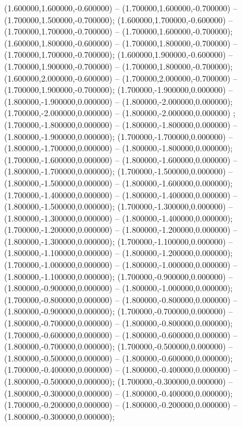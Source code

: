  (1.600000,1.600000,-0.600000) -- (1.700000,1.600000,-0.700000) -- (1.700000,1.500000,-0.700000);
 (1.600000,1.700000,-0.600000) -- (1.700000,1.700000,-0.700000) -- (1.700000,1.600000,-0.700000);
 (1.600000,1.800000,-0.600000) -- (1.700000,1.800000,-0.700000) -- (1.700000,1.700000,-0.700000);
 (1.600000,1.900000,-0.600000) -- (1.700000,1.900000,-0.700000) -- (1.700000,1.800000,-0.700000);
 (1.600000,2.000000,-0.600000) -- (1.700000,2.000000,-0.700000) -- (1.700000,1.900000,-0.700000);
 (1.700000,-1.900000,0.000000) -- (1.800000,-1.900000,0.000000) -- (1.800000,-2.000000,0.000000);
 (1.700000,-2.000000,0.000000) -- (1.800000,-2.000000,0.000000) ;
 (1.700000,-1.800000,0.000000) -- (1.800000,-1.800000,0.000000) -- (1.800000,-1.900000,0.000000);
 (1.700000,-1.700000,0.000000) -- (1.800000,-1.700000,0.000000) -- (1.800000,-1.800000,0.000000);
 (1.700000,-1.600000,0.000000) -- (1.800000,-1.600000,0.000000) -- (1.800000,-1.700000,0.000000);
 (1.700000,-1.500000,0.000000) -- (1.800000,-1.500000,0.000000) -- (1.800000,-1.600000,0.000000);
 (1.700000,-1.400000,0.000000) -- (1.800000,-1.400000,0.000000) -- (1.800000,-1.500000,0.000000);
 (1.700000,-1.300000,0.000000) -- (1.800000,-1.300000,0.000000) -- (1.800000,-1.400000,0.000000);
 (1.700000,-1.200000,0.000000) -- (1.800000,-1.200000,0.000000) -- (1.800000,-1.300000,0.000000);
 (1.700000,-1.100000,0.000000) -- (1.800000,-1.100000,0.000000) -- (1.800000,-1.200000,0.000000);
 (1.700000,-1.000000,0.000000) -- (1.800000,-1.000000,0.000000) -- (1.800000,-1.100000,0.000000);
 (1.700000,-0.900000,0.000000) -- (1.800000,-0.900000,0.000000) -- (1.800000,-1.000000,0.000000);
 (1.700000,-0.800000,0.000000) -- (1.800000,-0.800000,0.000000) -- (1.800000,-0.900000,0.000000);
 (1.700000,-0.700000,0.000000) -- (1.800000,-0.700000,0.000000) -- (1.800000,-0.800000,0.000000);
 (1.700000,-0.600000,0.000000) -- (1.800000,-0.600000,0.000000) -- (1.800000,-0.700000,0.000000);
 (1.700000,-0.500000,0.000000) -- (1.800000,-0.500000,0.000000) -- (1.800000,-0.600000,0.000000);
 (1.700000,-0.400000,0.000000) -- (1.800000,-0.400000,0.000000) -- (1.800000,-0.500000,0.000000);
 (1.700000,-0.300000,0.000000) -- (1.800000,-0.300000,0.000000) -- (1.800000,-0.400000,0.000000);
 (1.700000,-0.200000,0.000000) -- (1.800000,-0.200000,0.000000) -- (1.800000,-0.300000,0.000000);
